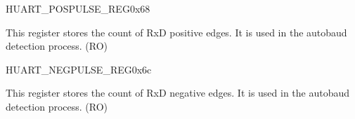 \begin{register}{H}{UART\_POSPULSE\_REG}{0x68}\label{regdesc:UARTPOSPULSEREG}
%
%
\regnewline%
\begin{regdesc}\begin{reglist}
\item [UART\_POSEDGE\_MIN\_CNT]This register stores the count of RxD positive edges. It is used in the autobaud detection process. (RO)
\end{reglist}\end{regdesc}
\end{register}


\begin{register}{H}{UART\_NEGPULSE\_REG}{0x6c}\label{regdesc:UARTNEGPULSEREG}
%
%
\regnewline%
\begin{regdesc}\begin{reglist}
\item [UART\_NEGEDGE\_MIN\_CNT]This register stores the count of RxD negative edges. It is used in the autobaud detection process. (RO)
\end{reglist}\end{regdesc}
\end{register}

